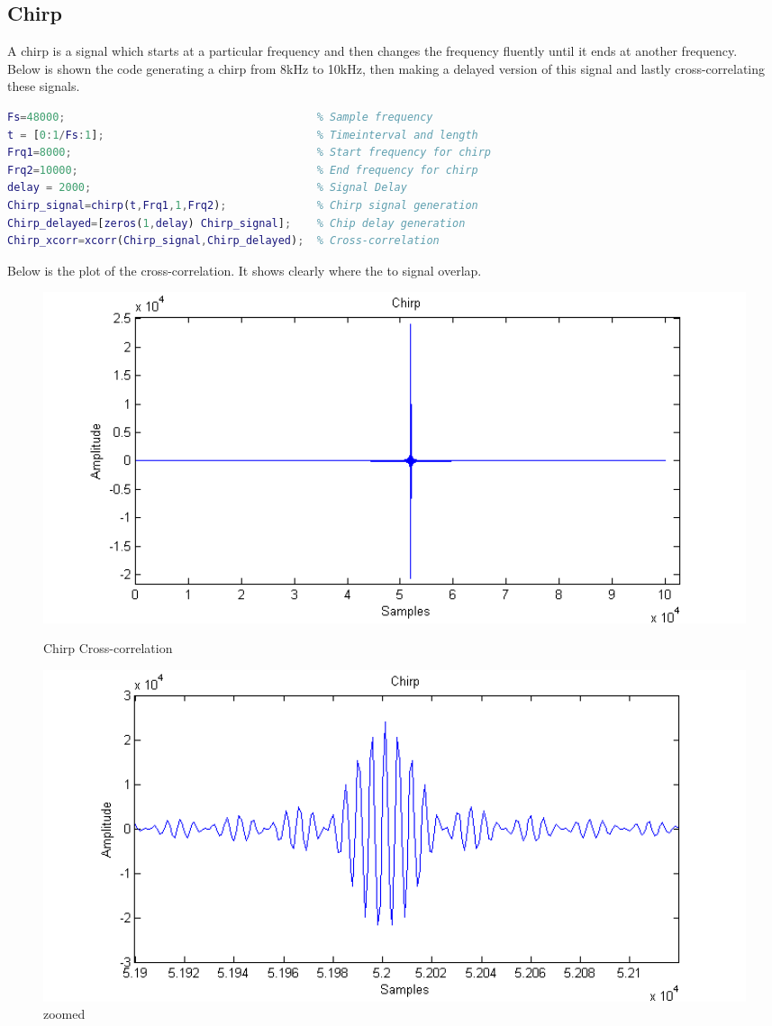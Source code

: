 \subsection{Chirp}
A chirp is a signal which starts at a particular frequency and then changes the frequency fluently until it ends at another frequency.\\
Below is shown the code generating a chirp from 8kHz to 10kHz, then making a delayed version of this signal and lastly cross-correlating these signals.\\
\begin{lstlisting}[language=Matlab,frame=lrtb,label=Matlab Code for Chirp Cross-correlation]
Fs=48000;                                       % Sample frequency
t = [0:1/Fs:1];                                 % Timeinterval and length
Frq1=8000;                                      % Start frequency for chirp
Frq2=10000;                                     % End frequency for chirp
delay = 2000;                                   % Signal Delay
Chirp_signal=chirp(t,Frq1,1,Frq2);              % Chirp signal generation
Chirp_delayed=[zeros(1,delay) Chirp_signal];    % Chip delay generation
Chirp_xcorr=xcorr(Chirp_signal,Chirp_delayed);  % Cross-correlation
\end{lstlisting}
Below is the plot of the cross-correlation. It shows clearly where the to signal overlap.\\
\begin{figure}[H]
\begin{minipage}[b]{0.49\linewidth}
\centering
\includegraphics[width=1\textwidth]{billeder/chirp_xcorr_fig}
\caption{Chirp Cross-correlation}
\label{fig:figure1}
\end{minipage}
\hspace{0.5cm}
\begin{minipage}[b]{0.49\linewidth}
\centering
\includegraphics[width=1\textwidth]{billeder/chirp_xcorr_fig_zoom}
\caption{zoomed}
\label{fig:figure2}
\end{minipage}
\end{figure}
